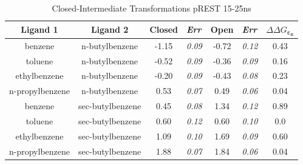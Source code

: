\documentclass[T4paper.tex]{subfiles}
\begin{document}
\begin{table}[!htb]
\centering
\caption{Closed-Intermediate Transformations pREST 15-25ns}
\label{tbl:C-I_pRESText}
\begin{tabular}{|c|c|c|l|c|l|c|}
\hline
\textbf{Ligand 1}                       & \textbf{Ligand 2}                        & {\color[HTML]{800080} \textbf{Closed}} & {\color[HTML]{800080} \textit{Err}} & {\color[HTML]{008000} \textbf{Open}} & {\color[HTML]{008000} \textit{Err}} & \textbf{$\Delta\Delta G_{\boldsymbol{\varepsilon_n}}$}            \\ \hline
\cellcolor[HTML]{800080}benzene         & \cellcolor[HTML]{00FFFF}n-butylbenzene   & -1.15                                   & \textit{0.09}                       & -0.72                                & \textit{0.12}                       & \cellcolor[HTML]{9AFF99}0.43 \\ \hline
\cellcolor[HTML]{800080}toluene         & \cellcolor[HTML]{00FFFF}n-butylbenzene   & -0.52                                  & \textit{0.09}                       & -0.36                                & \textit{0.09}                       & \cellcolor[HTML]{9AFF99}0.16 \\ \hline
\cellcolor[HTML]{800080}ethylbenzene    & \cellcolor[HTML]{00FFFF}n-butylbenzene   & -0.20                                   & \textit{0.09}                       & -0.43                                & \textit{0.08}                       & \cellcolor[HTML]{9AFF99}0.23 \\ \hline
\cellcolor[HTML]{800080}n-propylbenzene & \cellcolor[HTML]{00FFFF}n-butylbenzene   & 0.53                                  & \textit{0.07}                       & 0.49                                 & \textit{0.06}                       & \cellcolor[HTML]{9AFF99}0.04 \\ \hline
\cellcolor[HTML]{800080}benzene         & \cellcolor[HTML]{00FFFF}sec-butylbenzene & 0.45                                   & \textit{0.08}                       & 1.34                                 & \textit{0.12}                       & \cellcolor[HTML]{9AFF99}0.89 \\ \hline
\cellcolor[HTML]{800080}toluene         & \cellcolor[HTML]{00FFFF}sec-butylbenzene & 0.60                                   & \textit{0.12}                       & 0.60                                 & \textit{0.10}                       & \cellcolor[HTML]{9AFF99}0.0 \\ \hline
\cellcolor[HTML]{800080}ethylbenzene    & \cellcolor[HTML]{00FFFF}sec-butylbenzene & 1.09                                   & \textit{0.10}                       & 1.69                                 & \textit{0.09}                       & \cellcolor[HTML]{9AFF99}0.60 \\ \hline
\cellcolor[HTML]{800080}n-propylbenzene & \cellcolor[HTML]{00FFFF}sec-butylbenzene & 1.88                                   & \textit{0.07}                       & 1.84                                 & \textit{0.06}                       & \cellcolor[HTML]{9AFF99}0.04 \\ \hline
\end{tabular}
\end{table}
\end{document}
